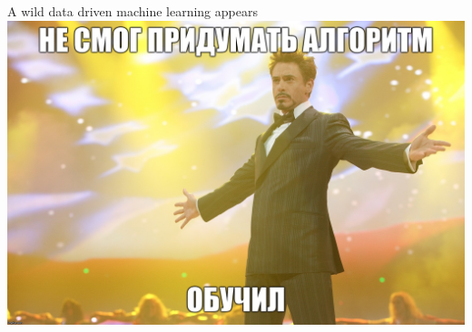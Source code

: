 \documentclass[aspectratio=169, professionalfonts]{beamer}
\begin{document}
\begin{frame}{A wild data driven machine learning appears}
    \centering
    \includegraphics[width=.73\linewidth]{figures/fig28-iron-man.jpg}
\end{frame}
\end{document}

